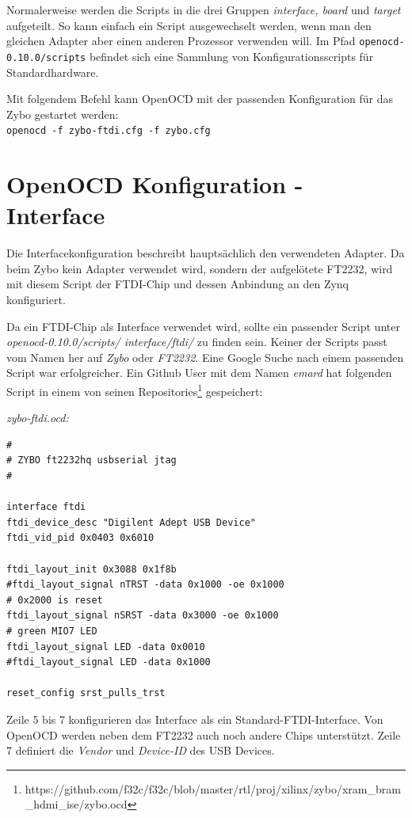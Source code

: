 Normalerweise werden die Scripts in die drei Gruppen \textit{interface, board} und \textit{target} aufgeteilt.
So kann einfach ein Script ausgewechselt werden, wenn man den gleichen Adapter aber einen anderen Prozessor verwenden will.
Im Pfad \texttt{openocd-0.10.0/scripts} befindet sich eine Sammlung von Konfigurationsscripts für Standardhardware.

Mit folgendem Befehl kann OpenOCD mit der passenden Konfiguration für das Zybo gestartet werden:\\
\texttt{openocd -f zybo-ftdi.cfg -f zybo.cfg}


\section{OpenOCD Konfiguration - Interface}
Die Interfacekonfiguration beschreibt hauptsächlich den verwendeten Adapter.
Da beim Zybo kein Adapter verwendet wird, sondern der aufgelötete FT2232, wird mit diesem Script der FTDI-Chip und dessen Anbindung an den Zynq konfiguriert.

Da ein FTDI-Chip als Interface verwendet wird, sollte ein passender Script unter \textit{openocd-0.10.0/scripts/ interface/ftdi/} zu finden sein.
Keiner der Scripts passt vom Namen her auf \textit{Zybo} oder \textit{FT2232}.
Eine Google Suche nach einem passenden Script war erfolgreicher.
Ein Github User mit dem Namen \textit{emard} hat folgenden Script in einem von seinen Repositories\footnote{https://github.com/f32c/f32c/blob/master/rtl/proj/xilinx/zybo/xram\_bram\_hdmi\_ise/zybo.ocd} gespeichert:

\textit{zybo-ftdi.ocd:}
\lstset{language=tcl}
\begin{lstlisting}[frame=single]
#
# ZYBO ft2232hq usbserial jtag
#

interface ftdi
ftdi_device_desc "Digilent Adept USB Device"
ftdi_vid_pid 0x0403 0x6010

ftdi_layout_init 0x3088 0x1f8b
#ftdi_layout_signal nTRST -data 0x1000 -oe 0x1000
# 0x2000 is reset
ftdi_layout_signal nSRST -data 0x3000 -oe 0x1000
# green MIO7 LED
ftdi_layout_signal LED -data 0x0010
#ftdi_layout_signal LED -data 0x1000

reset_config srst_pulls_trst

\end{lstlisting}

Zeile 5 bis 7 konfigurieren das Interface als ein Standard-FTDI-Interface.
Von OpenOCD werden neben dem FT2232 auch noch andere Chips unterstützt.
Zeile 7 definiert die \textit{Vendor} und \textit{Device-ID} des USB Devices.


